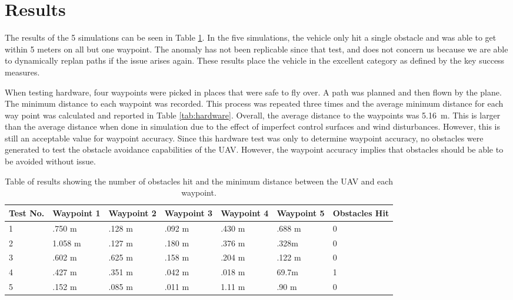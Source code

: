 \documentclass[]{auvsi_doc}
\begin{document}
\section*{Results}

The results of the 5 simulations can be seen in Table \ref{tab:results}. In the five simulations, the vehicle only hit a single obstacle and was able to get within 5 meters on all but one waypoint. The anomaly has not been replicable since that test, and does not concern us because we are able to dynamically replan paths if the issue arises again.
These results place the vehicle in the excellent category as defined by the key success measures.

When testing hardware, four waypoints were picked in places that were safe to fly over. A path was planned and then flown by the plane. The minimum distance to each waypoint was recorded. This process was repeated three times and the average minimum distance for each way point was calculated and reported in Table \ref{tab:hardware}. Overall, the average distance to the waypoints was 5.16~m. This is larger than the average distance when done in simulation due to the effect of imperfect control surfaces and wind disturbances. However, this is still an acceptable value for waypoint accuracy. Since this hardware test was only to determine waypoint accuracy, no obstacles were generated to test the obstacle avoidance capabilities of the UAV. However, the waypoint accuracy implies that obstacles should be able to be avoided without issue.

\begin{table}[h!]

\caption{Table of results showing the number of obstacles hit and the minimum distance between the UAV and each waypoint.}
\label{tab:results}
\begin{tabular} {|l|l|l|l|l|l|l|}
\hline
Test No. & Waypoint 1&Waypoint 2&Waypoint 3&Waypoint 4&Waypoint 5& Obstacles Hit\\
\hline
1 & .750 m& .128 m& .092 m& .430 m& .688 m & 0\\
2 & 1.058 m &.127 m & .180 m & .376 m & .328m & 0\\
3& .602 m& .625 m&.158 m& .204 m& .122 m& 0\\
4& .427 m & .351 m & .042 m & .018 m& 69.7m& 1\\
5& .152 m& .085 m& .011 m & 1.11 m & .90 m& 0\\
\hline
\end{tabular}
\end{table}
\end{document}
